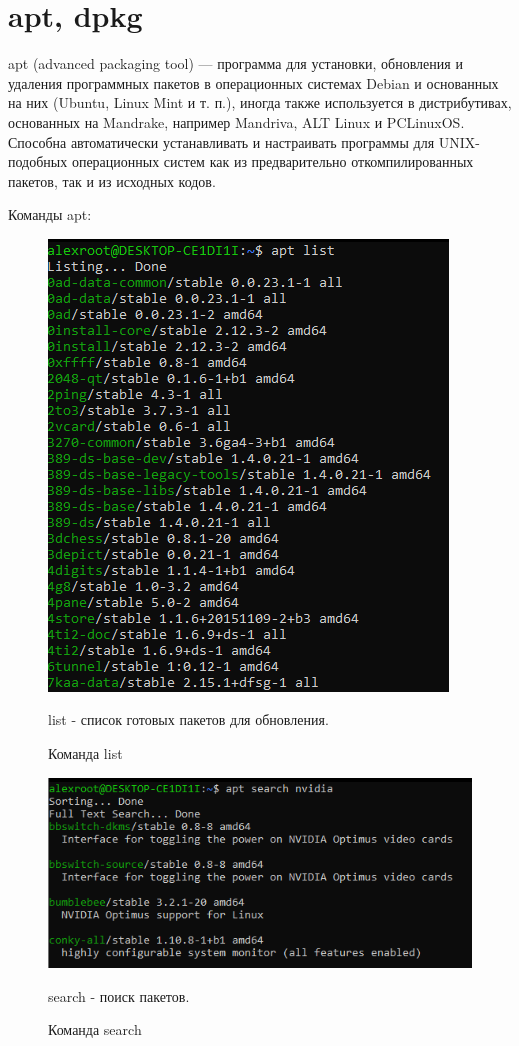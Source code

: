 \documentclass[a4paper,14pt]{extarticle}
\begin{document}
\section{apt, dpkg}
apt (advanced packaging tool) — программа для установки, обновления и удаления программных пакетов в операционных системах Debian и основанных на них (Ubuntu, Linux Mint и т. п.), иногда также используется в дистрибутивах, основанных на Mandrake, например Mandriva, ALT Linux и PCLinuxOS. Способна автоматически устанавливать и настраивать программы для UNIX-подобных операционных систем как из предварительно откомпилированных пакетов, так и из исходных кодов.

Команды apt:
\begin{figure}[h!]
\centering
\includegraphics[width=0.8\linewidth]{list.png}
\caption{Команда list}
\label{fig:mpr}
list - список готовых пакетов для обновления. 
\end{figure}

\begin{figure}[h!]
\centering
\includegraphics[width=0.8\linewidth]{search.png}
\caption{Команда search}
\label{fig:mpr}
search - поиск пакетов. 
\end{figure}
\end{document}
